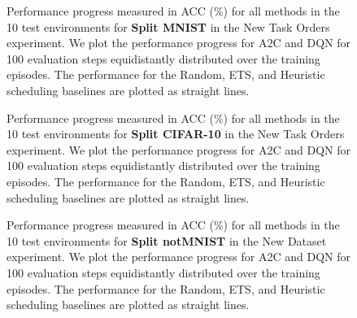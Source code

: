 \clearpage
\begin{figure}[t]
  \centering
  \setlength{\figwidth}{0.26\textwidth}
  \setlength{\figheight}{.14\textheight}
  
  \vspace{-3mm}
  \caption{Performance progress measured in ACC (\%) for all methods in the 10 test environments for {\bf Split MNIST} in the New Task Orders experiment. We plot the performance progress for A2C and DQN for 100 evaluation steps equidistantly distributed over the training episodes. The performance for the Random, ETS, and Heuristic scheduling baselines are plotted as straight lines.  }
  \label{fig:policy_rewards_mnist_paperD}
  \vspace{-3mm}
\end{figure}


\begin{figure}[t]
  \centering
  \setlength{\figwidth}{0.26\textwidth}
  \setlength{\figheight}{.14\textheight}
  
  \vspace{-3mm}
  \caption{Performance progress measured in ACC (\%) for all methods in the 10 test environments for {\bf Split CIFAR-10} in the New Task Orders experiment. We plot the performance progress for A2C and DQN for 100 evaluation steps equidistantly distributed over the training episodes. The performance for the Random, ETS, and Heuristic scheduling baselines are plotted as straight lines.  }
  \label{fig:policy_rewards_cifar10_paperD}
  \vspace{-3mm}
\end{figure}

\clearpage

\begin{figure}[t]
  \centering
  \setlength{\figwidth}{0.26\textwidth}
  \setlength{\figheight}{.14\textheight}
  
  \vspace{-3mm}
  \caption{Performance progress measured in ACC (\%) for all methods in the 10 test environments for {\bf Split notMNIST} in the New Dataset experiment. We plot the performance progress for A2C and DQN for 100 evaluation steps equidistantly distributed over the training episodes. The performance for the Random, ETS, and Heuristic scheduling baselines are plotted as straight lines.  }
  \label{fig:policy_rewards_notmnist_new_dataset_paperD}
  \vspace{-3mm}
\end{figure}


